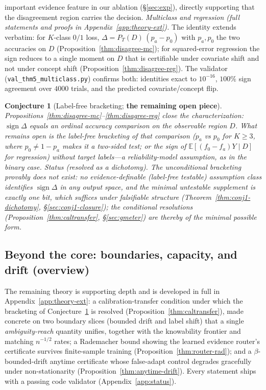\documentclass[conference]{IEEEtran}
\theoremstyle{plain}
\newtheorem{conjecture}{Conjecture}
\theoremstyle{definition}
\newcommand{\E}{\mathbb{E}}
\newcommand{\sign}{\operatorname{sign}}
\begin{document}
important evidence feature in our ablation (\S\ref{sec:exp}), directly supporting that
the disagreement region carries the decision.
\noindent\emph{Multiclass and regression (full statements and proofs in
Appendix~\ref{app:theory-ext}).} The identity extends verbatim: for $K$-class $0/1$
loss, $\Delta=P_T(D)\,(p_a-p_0)$ with $p_a,p_0$ the two accuracies on $D$
(Proposition~\ref{thm:disagree-mc}); for squared-error regression the sign reduces to a
single moment on $D$ that is certifiable under covariate shift and not under concept
shift (Proposition~\ref{thm:disagree-reg}). The validator
(\texttt{val\_thm5\_multiclass.py}) confirms both: identities exact to $10^{-16}$,
$100\%$ sign agreement over $4000$ trials, and the predicted covariate/concept flip.
\begin{conjecture}[Label-free bracketing; \textbf{the remaining open piece}]\label{conj:gen}
Propositions~\ref{thm:disagree-mc}--\ref{thm:disagree-reg} \emph{close the characterization}:
$\sign\Delta$ equals an ordinal accuracy comparison on the observable region $D$. What
remains open is the label-free \emph{bracketing} of that comparison ($p_a$ vs $p_0$ for
$K\ge3$, where $p_0\neq1-p_a$ makes it a two-sided test; or the sign of
$\E[(f_0-f_a)Y\mid D]$ for regression) without target labels---a reliability-model
assumption, as in the binary case.
\emph{Status (resolved as a dichotomy).} The unconditional bracketing provably does
not exist: no evidence-definable (label-free testable) assumption class identifies
$\sign\Delta$ in any output space, and the minimal untestable supplement is exactly one
bit, which suffices under falsifiable structure
(Theorem~\ref{thm:conj1-dichotomy}, \S\ref{sec:conj1-closure}); the conditional
resolutions (Proposition~\ref{thm:caltransfer}, \S\ref{sec:gmeter}) are thereby of the
minimal possible form.
\end{conjecture}

\subsection{Beyond the core: boundaries, capacity, and drift (overview)}\label{sec:beyond}
The remaining theory is supporting depth and is developed in full in
Appendix~\ref{app:theory-ext}: a calibration-transfer condition under which the
bracketing of Conjecture~\ref{conj:gen} is resolved (Proposition~\ref{thm:caltransfer}),
made concrete on two boundary slices (bounded drift and label shift) that a single
\emph{ambiguity-reach} quantity unifies, together with the knowability frontier and
matching $n^{-1/2}$ rates; a Rademacher bound showing the learned evidence router's
certificate survives finite-sample training (Proposition~\ref{thm:router-rad}); and a
$\beta$-bounded-drift anytime certificate whose false-adapt control degrades gracefully
under non-stationarity (Proposition~\ref{thm:anytime-drift}). Every statement ships with a
passing code validator (Appendix~\ref{app:status}).
\end{document}
